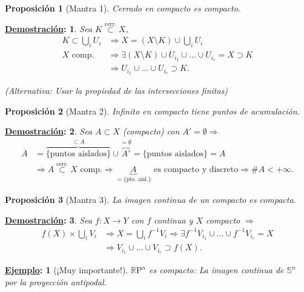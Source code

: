 \documentclass[10pt,a4paper,openright]{book}
\theoremstyle{break}
\newtheorem*{prop}{Proposición}
\newtheorem*{demo}{\underline{Demostración}:}
\newtheorem*{ej}{\underline{Ejemplo}:}
\begin{document}
\begin{prop}[Mantra 1]
Cerrado en compacto es compacto. 
\end{prop}
\begin{demo}
Sea $K \stackrel{\text{cerr.}}{\subset} X$,
\begin{align*}
    K \subset \bigcup_{i} U_i &\Rightarrow X = \left( X \setminus K \right) \cup \bigcup_{i} U_i\\
    X \text{ comp.} &\Rightarrow \exists \left( X \setminus K \right) \cup U_{i_1} \cup \ldots \cup U_{i_r} = X \supset K\\
    &\Rightarrow U_{i_1} \cup \ldots \cup U_{i_r} \supset K
.\end{align*}

(Alternativa: Usar la propiedad de las intersecciones finitas)
\end{demo}

\begin{prop}[Mantra 2]
Infinito en compacto tiene puntos de acumulación.
\end{prop}
\begin{demo}
Sea $A \subset X$ (compacto) con $A' = \emptyset \Rightarrow$
\begin{align*}
    \overline{A} &= \overbrace{\{\text{puntos aislados}\}}^{\subset A}  \cup \overbrace{A'}^{= \emptyset} = \{\text{puntos aislados}\} = A\\
     &\Rightarrow A \stackrel{\text{cerr.}}{\subset} X \text{ comp.} \Rightarrow \underbrace{A}_{= \{\text{pts. aisl.}\}} \text{ es compacto y discreto} \Rightarrow \#A < +\infty   
.\end{align*}
\end{demo}

\begin{prop}[Mantra 3]
La imagen continua de un compacto es compacta. 
\end{prop}
\begin{demo}
Sea $f: X \rightarrow Y$ con $f$ continua y $X$ compacto $\Rightarrow$
\begin{align*}
    f\left( X \right) \times \bigcup_{i} V_i &\Rightarrow X = \bigcup_{i} f^{-1} V_i \Rightarrow \exists f^{-1}V_{i_1} \cup \ldots \cup f^{-1}V_{i_r} = X\\
     &\Rightarrow V_{i_1} \cup \ldots \cup V_{i_r} \supset f\left( X \right) 
.\end{align*}
\end{demo}

\begin{ej}[¡Muy importante!]
$\mathbb{R} \mathrm{P}^n$ es compacto: La imagen continua de $\mathbb{S}^n$ por la proyección antipodal. 
\end{ej}
\end{document}
